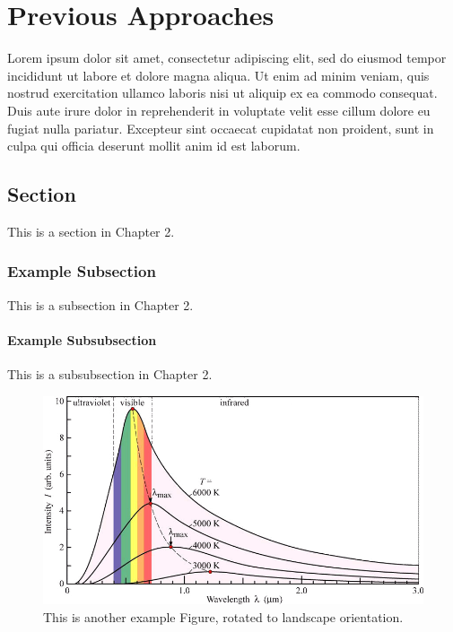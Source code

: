 \chapter{Previous Approaches}
Lorem ipsum dolor sit amet, consectetur adipiscing elit, sed do eiusmod tempor incididunt ut labore et dolore magna aliqua. Ut enim ad minim veniam, quis nostrud exercitation ullamco laboris nisi ut aliquip ex ea commodo consequat. Duis aute irure dolor in reprehenderit in voluptate velit esse cillum dolore eu fugiat nulla pariatur. Excepteur sint occaecat cupidatat non proident, sunt in culpa qui officia deserunt mollit anim id est laborum.

\section{Section}

This is a section in Chapter 2.

\subsection{Example Subsection}

This is a subsection in Chapter 2.

\subsubsection{Example Subsubsection}

This is a subsubsection in Chapter 2.

\begin{figure}
\includegraphics[width=\textwidth]{figures/exampleFigure.png}
\caption{This is another example Figure, rotated to landscape orientation.}
\label{LandscapeFigure}
\end{figure}
